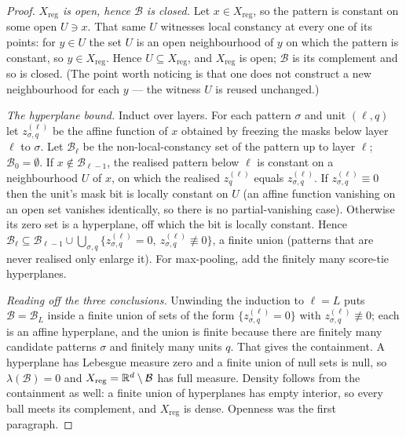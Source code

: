 \begin{proof}
\emph{$X_{\mathrm{reg}}$ is open, hence $\mathcal B$ is closed.} Let
$x\in X_{\mathrm{reg}}$, so the pattern is constant on some open $U\ni x$. That
same $U$ witnesses local constancy at every one of its points: for $y\in U$ the
set $U$ is an open neighbourhood of $y$ on which the pattern is constant, so
$y\in X_{\mathrm{reg}}$. Hence $U\subseteq X_{\mathrm{reg}}$, and
$X_{\mathrm{reg}}$ is open; $\mathcal B$ is its complement and so is closed.
(The point worth noticing is that one does not construct a new neighbourhood
for each $y$ --- the witness $U$ is reused unchanged.)

\emph{The hyperplane bound.} Induct over layers. For each pattern $\sigma$ and unit
$(\ell,q)$ let $z^{(\ell)}_{\sigma,q}$ be the affine function of $x$ obtained
by freezing the masks below layer $\ell$ to $\sigma$. Let $\mathcal B_{\ell}$
be the non-local-constancy set of the pattern up to layer $\ell$;
$\mathcal B_0=\emptyset$. If $x\notin\mathcal B_{\ell-1}$, the realised
pattern below $\ell$ is constant on a neighbourhood $U$ of $x$, on which the
realised $z^{(\ell)}_q$ equals $z^{(\ell)}_{\sigma,q}$. If
$z^{(\ell)}_{\sigma,q}\equiv0$ then the unit's mask bit is locally constant on
$U$ (an affine function vanishing on an open set vanishes identically, so
there is no partial-vanishing case). Otherwise its zero set is a hyperplane,
off which the bit is locally constant. Hence
$\mathcal B_\ell\subseteq\mathcal B_{\ell-1}\cup\bigcup_{\sigma,q}
\{z^{(\ell)}_{\sigma,q}=0,\ z^{(\ell)}_{\sigma,q}\not\equiv0\}$, a finite
union (patterns that are never realised only enlarge it). For max-pooling, add
the finitely many score-tie hyperplanes.

\emph{Reading off the three conclusions.} Unwinding the induction to
$\ell=L$ puts $\mathcal B=\mathcal B_L$ inside a finite union of sets of the
form $\{z^{(\ell)}_{\sigma,q}=0\}$ with $z^{(\ell)}_{\sigma,q}\not\equiv0$;
each is an affine hyperplane, and the union is finite because there are
finitely many candidate patterns $\sigma$ and finitely many units $q$. That
gives the containment. A hyperplane has Lebesgue measure zero and a finite
union of null sets is null, so $\lambda(\mathcal B)=0$ and
$X_{\mathrm{reg}}=\mathbb{R}^d\setminus\mathcal B$ has full measure. Density follows
from the containment as well: a finite union of hyperplanes has empty interior,
so every ball meets its complement, and $X_{\mathrm{reg}}$ is dense. Openness
was the first paragraph. \qedhere
\end{proof}

